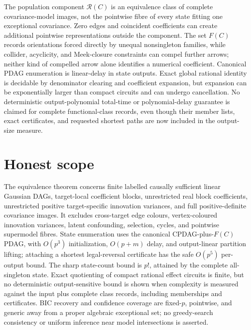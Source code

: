 \documentclass{article}
\begin{document}
The population component \(\mathcal R(C)\) is an equivalence class of complete covariance-model images, not the pointwise fibre of every state fitting one exceptional covariance. Zero edges and coincident coefficients can create additional pointwise representations outside the component. The set \(F(C)\) records orientations forced directly by unequal nonsingleton families, while collider, acyclicity, and Meek-closure constraints can compel further arrows; neither kind of compelled arrow alone identifies a numerical coefficient. Canonical PDAG enumeration is linear-delay in state outputs. Exact global rational identity is decidable by denominator clearing and coefficient expansion, but expansion can be exponentially larger than compact circuits and can undergo cancellation. No deterministic output-polynomial total-time or polynomial-delay guarantee is claimed for complete functional-class records, even though their member lists, exact certificates, and requested shortest paths are now included in the output-size measure.

\section{Honest scope}

The equivalence theorem concerns finite labelled causally sufficient linear Gaussian DAGs, target-local coefficient blocks, unrestricted real block coefficients, unrestricted positive target-specific innovation variances, and full positive-definite covariance images. It excludes cross-target edge colours, vertex-coloured innovation variances, latent confounding, selection, cycles, and pointwise supermodel fibres. State enumeration uses the canonical CPDAG-plus-\(F(C)\) PDAG, with \(O(p^3)\) initialization, \(O(p+m)\) delay, and output-linear partition lifting; attaching a shortest legal-reversal certificate has the safe \(O(p^5)\) per-output bound. The sharp state-count bound is \(p!\), attained by the complete all-singleton state. Exact quotienting of compact rational effect circuits is finite, but no deterministic output-sensitive bound is shown when complexity is measured against the input plus complete class records, including memberships and certificates. BIC recovery and confidence coverage are fixed-\(p\), pointwise, and generic away from a proper algebraic exceptional set; no greedy-search consistency or uniform inference near model intersections is asserted.
\end{document}
